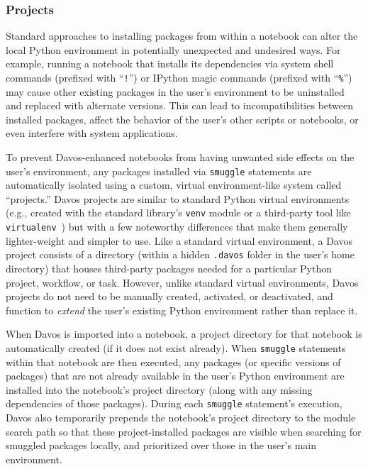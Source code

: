 \documentclass[preprint,12pt,a4paper]{elsarticle}
\begin{document}
\subsubsection{Projects}\label{subsec:projects}

Standard approaches to installing packages from within a notebook can alter the local Python environment in potentially unexpected and undesired ways.
For example, running a notebook that installs its dependencies via system shell commands (prefixed with ``\texttt{!}'') or IPython magic commands (prefixed with ``\texttt{\%}'') may cause other existing packages in the user's environment to be uninstalled and replaced with alternate versions.
This can lead to incompatibilities between installed packages, affect the behavior of the user's other scripts or notebooks, or even interfere with system applications.

To prevent Davos-enhanced notebooks from having unwanted side effects on the user's environment, any packages installed via \texttt{smuggle} statements are automatically isolated using a custom, virtual environment-like system called ``projects.''
Davos projects are similar to standard Python virtual environments (e.g., created with the standard library's \texttt{venv} module or a third-party tool like \texttt{virtualenv}~\cite{BickEtal07}) but with a few noteworthy differences that make them generally lighter-weight and simpler to use.
Like a standard virtual environment, a Davos project consists of a directory (within a hidden \texttt{.davos} folder in the user's home directory) that houses third-party packages needed for a particular Python project, workflow, or task.
However, unlike standard virtual environments, Davos projects do not need to be manually created, activated, or deactivated, and function to \textit{extend} the user's existing Python environment rather than replace it.

When Davos is imported into a notebook, a project directory for that notebook is automatically created (if it does not exist already).
When \texttt{smuggle} statements within that notebook are then executed, any packages (or specific versions of packages) that are not already available in the user's Python environment are installed into the notebook's project directory (along with any missing dependencies of those packages).
During each \texttt{smuggle} statement's execution, Davos also temporarily prepends the notebook's project directory to the module search path so that these project-installed packages are visible when searching for smuggled packages locally, and prioritized over those in the user's main environment.
\end{document}
